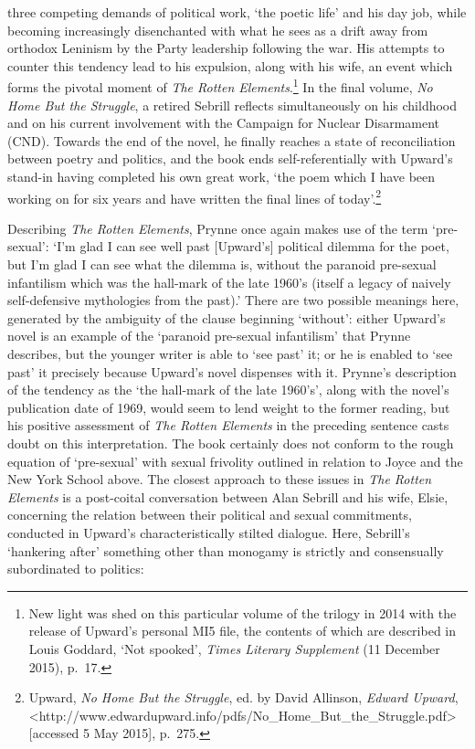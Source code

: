 \documentclass[]{article}
\begin{document}
three competing demands of political work, ‘the poetic life’ and his day
job, while becoming increasingly disenchanted with what he sees as a
drift away from orthodox Leninism by the Party leadership following the
war. His attempts to counter this tendency lead to his expulsion, along
with his wife, an event which forms the pivotal moment of \emph{The
Rotten Elements}.\footnote{New light was shed on this particular volume
  of the trilogy in 2014 with the release of Upward’s personal MI5 file,
  the contents of which are described in Louis Goddard, ‘Not spooked’,
  \emph{Times Literary Supplement} (11 December 2015), p.~17.} In the
final volume, \emph{No Home But the Struggle}, a retired Sebrill
reflects simultaneously on his childhood and on his current involvement
with the Campaign for Nuclear Disarmament (CND). Towards the end of the
novel, he finally reaches a state of reconciliation between poetry and
politics, and the book ends self-referentially with Upward’s stand-in
having completed his own great work, ‘the poem which I have been working
on for six years and have written the final lines of today’.\footnote{Upward,
  \emph{No Home But the Struggle}, ed. by David Allinson, \emph{Edward
  Upward},
  \textless{}http://www.edwardupward.info\slash pdfs\slash No\_Home\_But\_the\_Struggle.pdf\textgreater{}
  {[}accessed 5 May 2015{]}, p.~275.}

Describing \emph{The Rotten Elements}, Prynne once again makes use of
the term ‘pre-sexual’: ‘I’m glad I can see well past {[}Upward’s{]}
political dilemma for the poet, but I’m glad I can see what the dilemma
is, without the paranoid pre-sexual infantilism which was the hall-mark
of the late 1960’s (itself a legacy of naively self-defensive
mythologies from the past).’ There are two possible meanings here,
generated by the ambiguity of the clause beginning ‘without’: either
Upward’s novel is an example of the ‘paranoid pre-sexual infantilism’
that Prynne describes, but the younger writer is able to ‘see past’ it;
or he is enabled to ‘see past’ it precisely because Upward’s novel
dispenses with it. Prynne’s description of the tendency as the ‘the
hall-mark of the late 1960’s’, along with the novel’s publication date
of 1969, would seem to lend weight to the former reading, but his
positive assessment of \emph{The Rotten Elements} in the preceding
sentence casts doubt on this interpretation. The book certainly does not
conform to the rough equation of ‘pre-sexual’ with sexual frivolity
outlined in relation to Joyce and the New York School above. The closest
approach to these issues in \emph{The Rotten Elements} is a post-coital
conversation between Alan Sebrill and his wife, Elsie, concerning the
relation between their political and sexual commitments, conducted in
Upward’s characteristically stilted dialogue. Here, Sebrill’s ‘hankering
after’ something other than monogamy is strictly and consensually
subordinated to politics:
\end{document}
